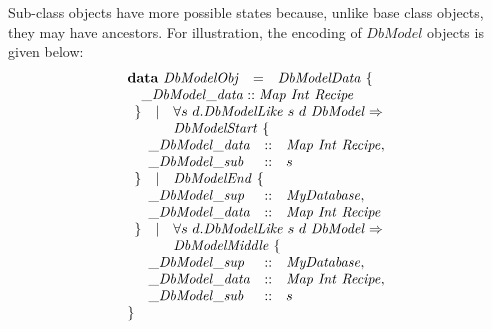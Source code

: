 Sub-class objects have more possible states because, unlike base class objects, they may have ancestors. For illustration, the encoding of $\mathit{DbModel}$ objects is given below:
\begin{displaymath}
\begin{array}{lcl}
\mathbf{data}~\mathit{DbModelObj} & = & \mathit{DbModelData}~\{ \\ 
\multicolumn{3}{l}{\quad \_\mathit{DbModel}\_\mathit{data} :: \mathit{Map}~\mathit{Int}~\mathit{Recipe}}\\
\multicolumn{3}{l}{\begin{array}{lcl}
    \} & \mid & \forall s~d.\mathit{DbModelLike}~s~d~\mathit{DbModel} \Rightarrow \\
    & &  \mathit{DbModelStart}~\{
    \end{array}}  \\
\multicolumn{3}{l}{\quad \begin{array}{lcl}
    \_\mathit{DbModel}\_\mathit{data} & :: & \mathit{Map}~\mathit{Int}~\mathit{Recipe},\\
    \_\mathit{DbModel}\_\mathit{sub}  & :: & s
    \end{array}}\\
\multicolumn{3}{l}{ \begin{array}{lcl}
    \} & \mid & \mathit{DbModelEnd}~\{ 
    \end{array}}  \\
\multicolumn{3}{l}{\quad \begin{array}{lcl}
    \_\mathit{DbModel}\_\mathit{sup}  & :: & \mathit{MyDatabase}, \\
    \_\mathit{DbModel}\_\mathit{data} & :: & \mathit{Map}~\mathit{Int}~\mathit{Recipe}
    \end{array}}\\
\multicolumn{3}{l}{ \begin{array}{lcl}
    \} & \mid & \forall s~d.\mathit{DbModelLike}~s~d~\mathit{DbModel} \Rightarrow \\
    & &  \mathit{DbModelMiddle}~\{
    \end{array}}  \\
\multicolumn{3}{l}{ \quad \begin{array}{lcl}
    \_\mathit{DbModel}\_\mathit{sup}  & :: & \mathit{MyDatabase}, \\
    \_\mathit{DbModel}\_\mathit{data} & :: & \mathit{Map}~\mathit{Int}~\mathit{Recipe}, \\
    \_\mathit{DbModel}\_\mathit{sub}  & :: & s
    \end{array}}\\
\} &&
\end{array}
\end{displaymath}

